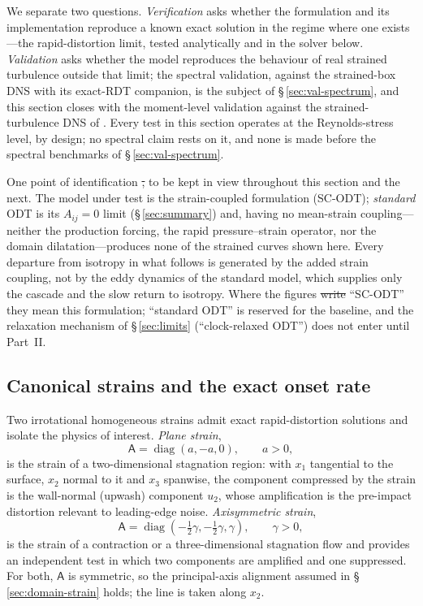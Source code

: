 \documentclass[lineno]{JFM-FLM_Au}
\providecommand{\DIFadd}[1]{{\protect\color{blue}\uwave{#1}}} %
\providecommand{\DIFdel}[1]{{\protect\color{red}\sout{#1}}} %
\providecommand{\DIFaddbegin}{} %
\providecommand{\DIFaddend}{} %
\providecommand{\DIFdelbegin}{} %
\providecommand{\DIFdelend}{} %
\begin{document}
We separate two questions. \emph{Verification} asks whether the
formulation and its implementation reproduce a known exact solution in
the regime where one exists---the rapid-distortion limit, tested
analytically and in the solver below. \emph{Validation} asks whether the
model reproduces the behaviour of real strained turbulence outside that
limit; the spectral validation, against the strained-box DNS with its
exact-RDT companion, is the subject of \S\,\ref{sec:val-spectrum}, and
this section closes with the moment-level validation against the
strained-turbulence DNS of \citet{LeeReynolds1985}. Every test in this
section operates at the Reynolds-stress level, by design; no spectral
claim rests on it, and none is made before the spectral benchmarks of
\S\,\ref{sec:val-spectrum}.

One point of identification \DIFdelbegin \DIFdel{, }\DIFdelend \DIFaddbegin \DIFadd{should }\DIFaddend to be kept in view throughout this section
and the next. The model under test is the strain-coupled formulation
(SC-ODT); \emph{standard} ODT is its $A_{ij}=0$ limit
(\S\,\ref{sec:summary}) and, having no mean-strain coupling---neither
the production forcing, the rapid pressure--strain operator, nor the
domain dilatation---produces none of the strained curves shown here.
Every departure from isotropy in what follows is generated by the added
strain coupling, not by the eddy dynamics of the standard model, which
supplies only the cascade and the slow return to isotropy. Where the
figures \DIFdelbegin \DIFdel{write }\DIFdelend \DIFaddbegin \DIFadd{refer to }\DIFaddend ``SC-ODT'' they mean this formulation; ``standard ODT''
is reserved for the baseline, and the relaxation mechanism of
\S\,\ref{sec:limits} (``clock-relaxed ODT'') does not enter until
Part~II.

\subsection{Canonical strains and the exact onset rate}\label{sec:onset}

Two irrotational homogeneous strains admit exact rapid-distortion
solutions and isolate the physics of interest. \emph{Plane strain},
\begin{equation}
  \mathsf{A}=\operatorname{diag}(a,-a,0),\qquad a>0,
  \label{eq:plane-strain}
\end{equation}
is the strain of a two-dimensional stagnation region: with $x_1$
tangential to the surface, $x_2$ normal to it and $x_3$ spanwise, the
component compressed by the strain is the wall-normal (upwash) component
$u_2$, whose amplification is the pre-impact distortion relevant to
leading-edge noise. \emph{Axisymmetric strain},
\begin{equation}
  \mathsf{A}=\operatorname{diag}(-\tfrac12\gamma,-\tfrac12\gamma,\gamma),
  \qquad \gamma>0,
  \label{eq:axi-strain}
\end{equation}
is the strain of a contraction or a three-dimensional stagnation flow and
provides an independent test in which two components are amplified and
one suppressed. For both, $\mathsf{A}$ is symmetric, so the
principal-axis alignment assumed in \S\,\ref{sec:domain-strain} holds;
the line is taken along $x_2$.
\end{document}
